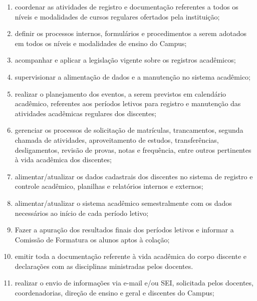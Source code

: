 \documentclass[a4paper,12pt]{report}
\begin{document}
\begin{enumerate}
\renewcommand{\labelenumi}{\Roman{enumi}}

\item coordenar as atividades de registro e documentação referentes a todos os níveis e 
      modalidades de cursos regulares ofertados pela instituição;

\item definir os processos internos, formulários e procedimentos a serem adotados em todos 
      os níveis e modalidades de ensino do Campus;

\item acompanhar e aplicar a legislação vigente sobre os registros acadêmicos;

\item supervisionar a alimentação de dados e a manutenção no sistema acadêmico;

\item realizar o planejamento dos eventos, a serem previstos em calendário acadêmico,  
      referentes aos períodos letivos para registro e manutenção das atividades acadêmicas regulares dos discentes;

\item gerenciar os processos de solicitação de matrículas, trancamentos, segunda chamada de       atividades, aproveitamento de estudos, transferências, desligamentos, revisão de 
      provas, notas e frequência, entre outros pertinentes à vida acadêmica dos discentes;

\item alimentar/atualizar os dados cadastrais dos discentes no sistema de registro e 
      controle acadêmico, planilhas e relatórios internos e externos;

\item alimentar/atualizar o sistema acadêmico semestralmente com os dados necessários ao 
      início de cada período letivo;

\item Fazer a apuração dos resultados finais dos períodos letivos e informar a Comissão de 
      Formatura os alunos aptos à colação;

\item emitir toda a documentação referente à vida acadêmica do corpo discente e declarações       com as disciplinas ministradas pelos docentes.

\item realizar o envio de informações via e-mail e/ou SEI, solicitada pelos docentes, 
      coordenadorias, direção de ensino e geral e discentes do Campus;


\end{enumerate}
\end{document}

